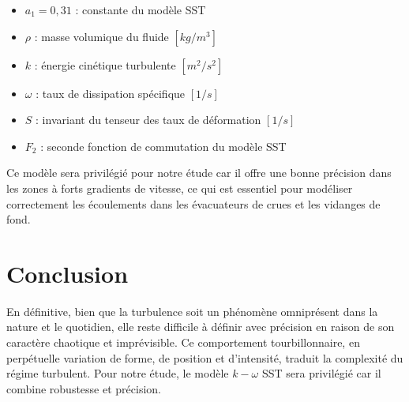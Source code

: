 \begin{itemize}
    \item[--] \(a_1 = 0{,}31\) : constante du modèle SST
    \item[--] \(\rho\) : masse volumique du fluide \([kg/m^3]\)
    \item[--] \(k\) : énergie cinétique turbulente \([m^2/s^2]\)
    \item[--] \(\omega\) : taux de dissipation spécifique \([1/s]\)
    \item[--] \(S\) : invariant du tenseur des taux de déformation \([1/s]\)
    \item[--] \(F_2\) : seconde fonction de commutation du modèle SST
\end{itemize}

Ce modèle sera privilégié pour notre étude car il offre une bonne précision dans les zones à forts gradients de vitesse, ce qui est essentiel pour modéliser correctement les écoulements dans les évacuateurs de crues et les vidanges de fond.


\section{Conclusion}
\label{sec:conclusion_chap2}

En définitive, bien que la turbulence soit un phénomène omniprésent dans la nature et le quotidien, elle reste difficile à définir avec précision en raison de son caractère chaotique et imprévisible. Ce comportement tourbillonnaire, en perpétuelle variation de forme, de position et d'intensité, traduit la complexité du régime turbulent. Pour notre étude, le modèle \( k-\omega \) SST sera privilégié car il combine robustesse et précision.